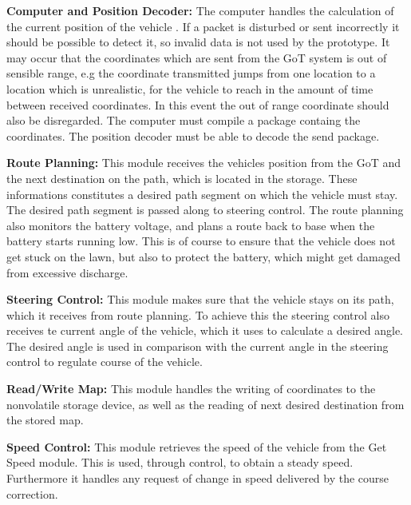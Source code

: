 \textbf{Computer and Position Decoder:}
The computer handles the calculation of the current position of the vehicle . If a packet is disturbed or sent incorrectly it should be possible to detect it, so invalid data is not used by the prototype. It may occur that the coordinates which are sent from the GoT system is out of sensible range, e.g the coordinate transmitted jumps from one location to a location which is unrealistic, for the vehicle to reach in the amount of time between received coordinates. In this event the out of range coordinate should also be disregarded. The computer must compile a package containg the coordinates. The position decoder must be able to decode the send package.

\textbf{Route Planning:}
This module receives the vehicles position from the GoT and the next destination on the path, which is located in the storage. These informations constitutes a desired path segment on which the vehicle must stay. The desired path segment is passed along to steering control.
The route planning also monitors the battery voltage, and plans a route back to base when the battery starts running low. This is of course to ensure that the vehicle does not get stuck on the lawn, but also to protect the battery, which might get damaged from excessive discharge.

\textbf{Steering Control:}
This module makes sure that the vehicle stays on its path, which it receives from route planning. To achieve this the steering control also receives te current angle of the vehicle, which it uses to calculate a desired angle. The desired angle is used in comparison with the current angle in the steering control to regulate course of the vehicle.

\textbf{Read/Write Map:}
This module handles the writing of coordinates to the nonvolatile storage device, as well as the reading of next desired destination from the stored map.

\textbf{Speed Control:}
This module retrieves the speed of the vehicle from the Get Speed module. This is used, through control, to obtain a steady speed. Furthermore it handles any request of change in speed delivered by the course correction.


